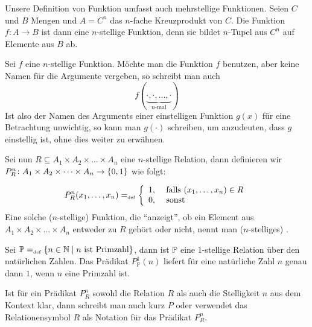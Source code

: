 \begin{remark}
Unsere Definition von Funktion umfasst auch mehrstellige
Funktionen. Seien $C$ und $B$ Mengen und $A = C^n$ das $n$-fache
Kreuzprodukt von $C$. Die Funktion $f \colon A \rightarrow B$ ist dann
eine $n$-stellige Funktion, denn sie bildet $n$-Tupel aus $C^n$ auf Elemente
aus $B$ ab.
\end{remark}

\begin{definition}
Sei $f$ eine $n$-stellige Funktion. Möchte man die Funktion $f$
benutzen, aber keine Namen für die Argumente vergeben, so
schreibt man auch 
\begin{displaymath}
f(\underbrace{\cdot, \cdot, \ldots , \cdot}_{\text{$n$-mal}})
\end{displaymath}
Ist also der Namen des Arguments einer einstelligen Funktion $g(x)$
für eine Betrachtung unwichtig, so kann man
$g(\cdot)$  schreiben, um anzudeuten, dass $g$
einstellig ist, ohne dies weiter zu erwähnen.
\end{definition}

Sei nun $R \subseteq A_1 \times A_2 \times \dots \times A_n$ eine
$n$-stellige Relation, dann definieren wir $P^n_R \colon A_1 \times
A_2 \times \dots \times A_n \rightarrow \{0,1\}$ wie folgt:

\begin{displaymath}
P^n_R({x_{1}}, \allowbreak \dots , \allowbreak{x_{n}}) =_{\mathrm{\scriptscriptstyle def}} 
\left\{
\begin{array}{rl}
1,& \text{ falls $({x_{1}}, \allowbreak \dots , \allowbreak{x_{n}}) \in R$}\\
0,& \text{ sonst} 
\end{array}
\right.
\end{displaymath}
Eine solche ($n$-stellige) Funktion, die "`anzeigt"', ob ein Element 
aus $A_1 \times A_2 \times \dots \times A_n$ entweder zu $R$ gehört 
oder nicht, nennt man ($n$-stelliges) .

\begin{example}
Sei $\mathbb{P} =_{\mathrm{\scriptscriptstyle def}} \{n \in \mathbb N \mid \text{$n$ ist Primzahl}\}$, dann
ist $\mathbb{P}$ eine $1$-stellige Relation über den natürlichen Zahlen. 
Das Prädikat $P^1_{\mathbb{P}}(n)$ liefert für eine natürliche Zahl
$n$ genau dann $1$, wenn $n$ eine Primzahl ist.
\end{example}

Ist für ein Prädikat $P^n_R$ sowohl die Relation $R$ als auch die
Stelligkeit $n$ aus dem Kontext klar, dann schreibt man auch kurz $P$
oder verwendet das Relationensymbol $R$ als Notation für das Prädikat
$P^n_R$. 


